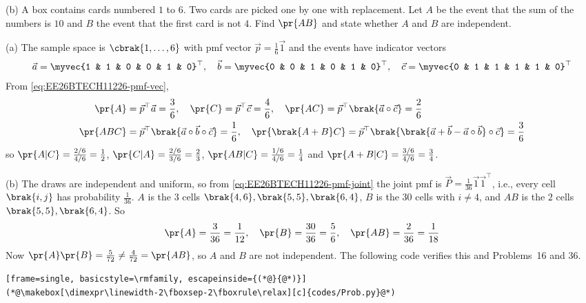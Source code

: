 \begin{enumerate}[label=\thesubsection.\arabic*, ref=\thesubsection.\theenumi, start=26]
(b) A box contains cards numbered $1$ to $6$. Two cards are picked one by one with replacement. Let $A$ be the event that the sum of the numbers is $10$ and $B$ the event that the first card is not $4$. Find $\pr{AB}$ and state whether $A$ and $B$ are independent.
\par\solution
(a) The sample space is $\cbrak{1,\dots,6}$ with pmf vector $\vec{p} = \frac{1}{6}\vec{1}$ and the events have indicator vectors
\begin{align}
	\vec{a} = \myvec{1 & 1 & 0 & 0 & 1 & 0}^{\top}, \quad
	\vec{b} = \myvec{0 & 0 & 1 & 0 & 1 & 0}^{\top}, \quad
	\vec{c} = \myvec{0 & 1 & 1 & 1 & 1 & 0}^{\top}
\end{align}
From \eqref{eq:EE26BTECH11226-pmf-vec},
\begin{align}
	\pr{A} &= \vec{p}^{\top}\vec{a} = \frac{3}{6}, \quad \pr{C} = \vec{p}^{\top}\vec{c} = \frac{4}{6}, \quad
	\pr{AC} = \vec{p}^{\top}\brak{\vec{a}\circ\vec{c}} = \frac{2}{6}
	\\
	\pr{ABC} &= \vec{p}^{\top}\brak{\vec{a}\circ\vec{b}\circ\vec{c}} = \frac{1}{6}, \quad
	\pr{\brak{A+B}C} = \vec{p}^{\top}\brak{\brak{\vec{a}+\vec{b}-\vec{a}\circ\vec{b}}\circ\vec{c}} = \frac{3}{6}
\end{align}
so $\pr{A\vert C} = \frac{2/6}{4/6} = \frac{1}{2}$, $\pr{C\vert A} = \frac{2/6}{3/6} = \frac{2}{3}$, $\pr{AB\vert C} = \frac{1/6}{4/6} = \frac{1}{4}$ and $\pr{A+B\vert C} = \frac{3/6}{4/6} = \frac{3}{4}$.

(b) The draws are independent and uniform, so from \eqref{eq:EE26BTECH11226-pmf-joint} the joint pmf is $\vec{P} = \frac{1}{36}\vec{1}\vec{1}^{\top}$, i.e., every cell $\brak{i,j}$ has probability $\frac{1}{36}$. $A$ is the $3$ cells $\brak{4,6},\brak{5,5},\brak{6,4}$, $B$ is the $30$ cells with $i \ne 4$, and $AB$ is the $2$ cells $\brak{5,5},\brak{6,4}$. So
\begin{align}
	\pr{A} = \frac{3}{36} = \frac{1}{12}, \quad \pr{B} = \frac{30}{36} = \frac{5}{6}, \quad \pr{AB} = \frac{2}{36} = \frac{1}{18}
\end{align}
Now $\pr{A}\pr{B} = \frac{5}{72} \ne \frac{4}{72} = \pr{AB}$, so $A$ and $B$ are not independent.
The following code verifies this and Problems~16 and 36.
\begin{lstlisting}[frame=single, basicstyle=\rmfamily, escapeinside={(*@}{@*)}]
(*@\makebox[\dimexpr\linewidth-2\fboxsep-2\fboxrule\relax][c]{codes/Prob.py}@*)
\end{lstlisting}
\end{enumerate}


